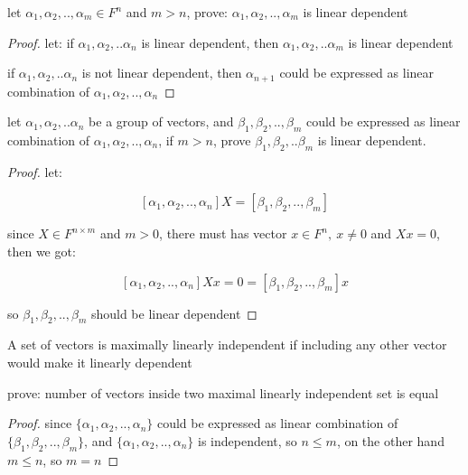 \begin{exercise}
    let $\alpha_1, \alpha_2, .. , \alpha_m \in F^n$ and $m > n$, prove: $\alpha_1, \alpha_2, .., \alpha_m$ is linear dependent
\end{exercise}

\begin{proof}
   let: if $\alpha_1, \alpha_2, .. \alpha_n$ is linear dependent, then $\alpha_1, \alpha_2, .. \alpha_m$ is linear dependent

   if $\alpha_1, \alpha_2, .. \alpha_n$ is not linear dependent, then $\alpha_{n+1}$ could be expressed as linear combination of 
   $\alpha_1, \alpha_2, .. , \alpha_n$
\end{proof}

\begin{exercise}
    let $\alpha_1, \alpha_2, .. \alpha_n$ be a group of vectors, and $\beta_1, \beta_2, .., \beta_m$ could be 
    expressed as linear combination of $\alpha_1, \alpha_2, .. , \alpha_n$, if $m > n$, prove
    $\beta_1, \beta_2, .. \beta_m$ is linear dependent.
\end{exercise}

\begin{proof}
    let:

    \[
    [\alpha_1, \alpha_2, .. , \alpha_n] X = [\beta_1, \beta_2, .. , \beta_m]
    \]

    since $X \in F^{n \times m}$ and $m > 0$, there must has vector $x \in F^{n},\: x \ne 0$ and $Xx = 0$, then we got:

    \[
    [\alpha_1, \alpha_2, .. , \alpha_n] X x = 0 = [\beta_1, \beta_2, .. , \beta_m]x 
    \]

    so $\beta_1, \beta_2, .. , \beta_m$ should be linear dependent
\end{proof}

\begin{definition}
A set of vectors is maximally linearly independent if including any other vector would make it linearly dependent
\end{definition}

\begin{exercise}
   prove: number of vectors inside two maximal linearly independent set is equal
\end{exercise}

\begin{proof}
    since $\{ \alpha_1, \alpha_2, .., \alpha_n \}$ could be expressed as linear combination of
    $\{ \beta_1, \beta_2, .., \beta_m \}$, and $\{ \alpha_1, \alpha_2, .., \alpha_n \}$
    is independent, so $n \le m$, on the other hand $m \le n$, so $m = n$
\end{proof}

